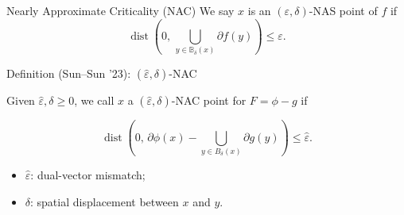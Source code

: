 \documentclass[10pt]{beamer}
\begin{document}
\begin{frame}{Nearly Approximate Criticality (NAC)}
\footnotesize
We say $x$ is an $(\varepsilon,\delta)$-NAS point of $f$ if
\[
    \operatorname{dist}\left(
        0,\,
        \bigcup_{y\in\mathbb{B}_{\delta}(x)}
        \partial f(y)
    \right)
    \le \varepsilon.
\]


\begin{block}{Definition (Sun--Sun '23): $(\widehat\varepsilon,\delta)$-NAC\footnotemark}

Given $\widehat\varepsilon,\delta\ge0$, we call $x$ a
$(\widehat\varepsilon,\delta)$-NAC point for $F=\phi-g$ if


\[\operatorname{dist}\!\left(
0,\,
\partial\phi(x)
-
\bigcup_{y\in B_\delta(x)}\partial g(y)
\right)
\le\widehat{\varepsilon}.\]

\end{block}

\medskip
\begin{itemize}\setlength{\itemsep}{1pt}
    \item $\widehat\varepsilon$: dual-vector mismatch;
    \item $\delta$: spatial displacement between $x$ and $y$.
\end{itemize}

\vfill
{}
\end{frame}
\end{document}
